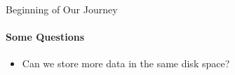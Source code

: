 \begin{frame}{Beginning of Our Journey}
\framesubtitle{Some Questions}
    \begin{itemize}
        \item Can we store more data in the same disk space?
    \end{itemize}
\end{frame}